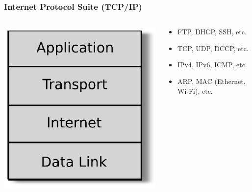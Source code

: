 \documentclass{beamer}
\begin{document}
\begin{frame}
  \frametitle{Internet Protocol Suite (TCP/IP)}
\begin{columns}

 \begin{column}{0.3\textwidth}
  \begin{center}
  \includegraphics[scale=0.42]{tcpip_stack}
  \end{center}
  \end{column}

  \begin{column}{0.5\textwidth}
    \begin{itemize}
      \item<1->[Application] FTP, DHCP, SSH, etc.
      \item<2->[Transport] TCP, UDP, DCCP, etc.
      \item<3->[Internet] IPv4, IPv6, {\color{red} ICMP}, etc.
      \item<4->[Data Link] ARP, MAC (Ethernet, Wi-Fi), etc.
    \end{itemize}
  \end{column}
\end{columns}

\end{frame}
\end{document}
